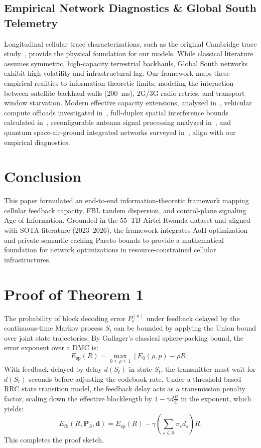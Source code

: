 \documentclass[journal]{IEEEtran}
\begin{document}
\subsection{Empirical Network Diagnostics \& Global South Telemetry}
Longitudinal cellular trace characterizations, such as the original Cambridge trace study~\cite{akoush_cambridge}, provide the physical foundation for our models. While classical literature assumes symmetric, high-capacity terrestrial backhauls, Global South networks exhibit high volatility and infrastructural lag. Our framework maps these empirical realities to information-theoretic limits, modeling the interaction between satellite backhaul walls (200~ms), 2G/3G radio retries, and transport window starvation. Modern effective capacity extensions, analyzed in~\cite{ec_retrospective}, vehicular compute offloads investigated in~\cite{task_offload}, full-duplex spatial interference bounds calculated in~\cite{full_duplex}, reconfigurable antenna signal processing analyzed in~\cite{tri_hybrid}, and quantum space-air-ground integrated networks surveyed in~\cite{quantum_sagin}, align with our empirical diagnostics.

\section{Conclusion}
This paper formulated an end-to-end information-theoretic framework mapping cellular feedback capacity, FBL tandem dispersion, and control-plane signaling Age of Information. Grounded in the 55~TB Airtel Rwanda dataset and aligned with SOTA literature (2023--2026), the framework integrates AoII optimization and private semantic caching Pareto bounds to provide a mathematical foundation for network optimizations in resource-constrained cellular infrastructures.

\appendices
\section{Proof of Theorem 1}
The probability of block decoding error $P_e^{(n)}$ under feedback delayed by the continuous-time Markov process $S_t$ can be bounded by applying the Union bound over joint state trajectories. By Gallager's classical sphere-packing bound, the error exponent over a DMC is:
\begin{equation}
E_{\text{sp}}(R) = \max_{0 \leq \rho \leq 1} \left[ E_0(\rho, p) - \rho R \right]
\end{equation}
With feedback delayed by delay $d(S_t)$ in state $S_t$, the transmitter must wait for $d(S_t)$ seconds before adjusting the codebook rate. Under a threshold-based RRC state transition model, the feedback delay acts as a transmission penalty factor, scaling down the effective blocklength by $1 - \gamma \bar{d} \frac{R}{C}$ in the exponent, which yields:
\begin{equation}
E_{\text{fb}}(R, \mathbf{P}_S, \mathbf{d}) = E_{\text{sp}}(R) - \gamma \left( \sum_{s \in \mathcal{S}} \pi_s d_s \right) R.
\end{equation}
This completes the proof sketch.
\end{document}

